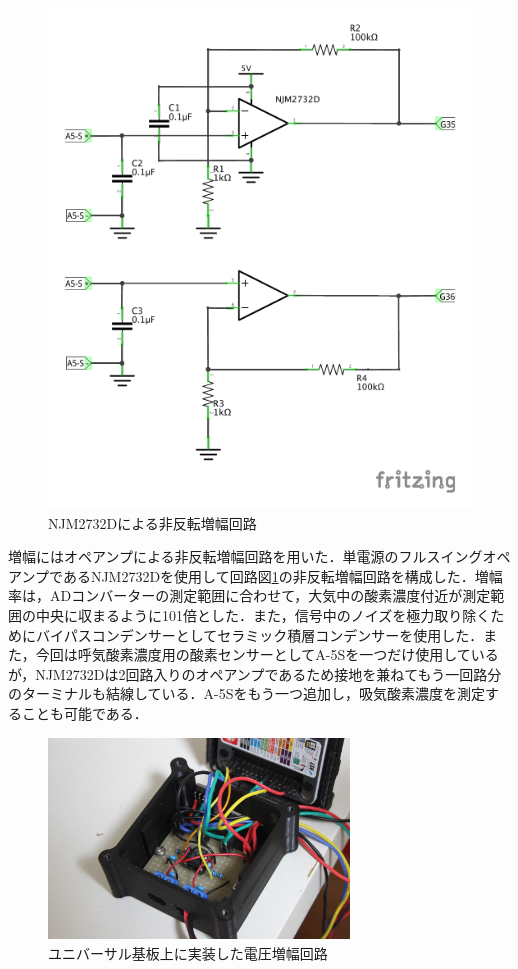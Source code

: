 \begin{figure}[H]
  \begin{center}
    \includegraphics[width=12cm]{fig/a-5s_opamp_schematic}
    \caption{NJM2732Dによる非反転増幅回路}
    \label{fig:a-5s_opamp_schematic}
  \end{center}
\end{figure}

増幅にはオペアンプによる非反転増幅回路を用いた．単電源のフルスイングオペアンプであるNJM2732Dを使用して回路図\ref{fig:a-5s_opamp_schematic}の非反転増幅回路を構成した．増幅率は，ADコンバーターの測定範囲に合わせて，大気中の酸素濃度付近が測定範囲の中央に収まるように101倍とした．また，信号中のノイズを極力取り除くためにバイパスコンデンサーとしてセラミック積層コンデンサーを使用した．また，今回は呼気酸素濃度用の酸素センサーとしてA-5Sを一つだけ使用しているが，NJM2732Dは2回路入りのオペアンプであるため接地を兼ねてもう一回路分のターミナルも結線している．A-5Sをもう一つ追加し，吸気酸素濃度を測定することも可能である．

\begin{figure}[H]
  \begin{center}
    \includegraphics[width=8cm]{fig/opamp_universal}
    \caption{ユニバーサル基板上に実装した電圧増幅回路}
    \label{fig:opamp_universal}
  \end{center}
\end{figure}

